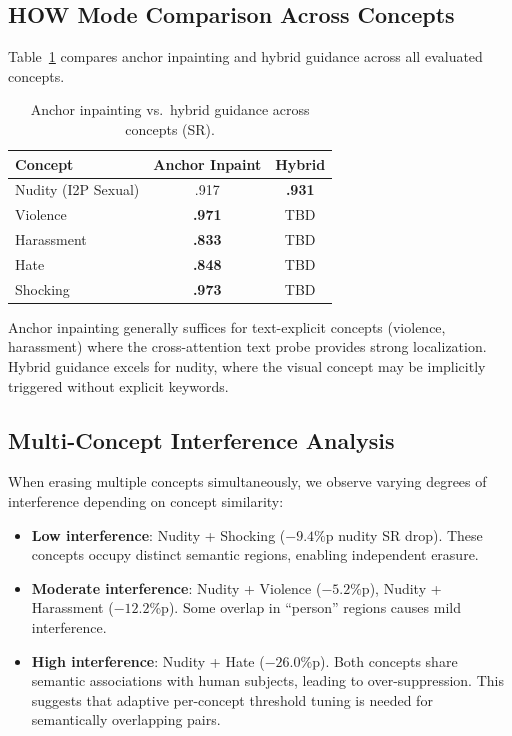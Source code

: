 \subsection{HOW Mode Comparison Across Concepts}
\label{app:how_modes}

Table~\ref{table:how_comparison} compares anchor inpainting and hybrid guidance across all evaluated concepts.

\begin{table}[h]
\centering
\caption{Anchor inpainting vs.\ hybrid guidance across concepts (SR).}
\label{table:how_comparison}
\small
\renewcommand{\arraystretch}{1.1}
\setlength{\tabcolsep}{0.7em}
\begin{tabular}{@{}l cc@{}}
\toprule
\textbf{Concept} & \textbf{Anchor Inpaint} & \textbf{Hybrid} \\
\midrule
Nudity (I2P Sexual) & .917 & \textbf{.931} \\
Violence & \textbf{.971} & TBD \\
Harassment & \textbf{.833} & TBD \\
Hate & \textbf{.848} & TBD \\
Shocking & \textbf{.973} & TBD \\
\bottomrule
\end{tabular}
\end{table}

Anchor inpainting generally suffices for text-explicit concepts (violence, harassment) where the cross-attention text probe provides strong localization. Hybrid guidance excels for nudity, where the visual concept may be implicitly triggered without explicit keywords.

\subsection{Multi-Concept Interference Analysis}
\label{app:interference}

When erasing multiple concepts simultaneously, we observe varying degrees of interference depending on concept similarity:

\begin{itemize}[leftmargin=1.5em,itemsep=2pt]
    \item \textbf{Low interference}: Nudity + Shocking ($-9.4$\%p nudity SR drop). These concepts occupy distinct semantic regions, enabling independent erasure.
    \item \textbf{Moderate interference}: Nudity + Violence ($-5.2$\%p), Nudity + Harassment ($-12.2$\%p). Some overlap in ``person'' regions causes mild interference.
    \item \textbf{High interference}: Nudity + Hate ($-26.0$\%p). Both concepts share semantic associations with human subjects, leading to over-suppression. This suggests that adaptive per-concept threshold tuning is needed for semantically overlapping pairs.
\end{itemize}

